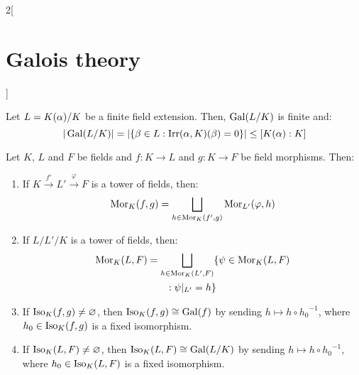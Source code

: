 \documentclass[../../../main.tex]{subfiles}
\begin{document}
\begin{multicols}{2}[\section{Galois theory}]
\begin{corollary}
    Let $L=\quot{K(\alpha)}{K}$ be a finite field extension. Then, $\Gal(\quot{L}{K})$ is finite and: $$\textstyle|\Gal(\quot{L}{K})|=|\{\beta\in L:\irr(\alpha,K)(\beta)=0\}|\leq[K(\alpha):K]$$
  \end{corollary}
  \begin{prop}
    Let $K$, $L$ and $F$ be fields and $f:K\rightarrow L$ and $g:K\rightarrow F$ be field morphisms. Then:
    \begin{enumerate}
      \item If $K\overset{f'}{\rightarrow} L'\overset{\varphi}{\rightarrow} F$ is a tower of fields, then: $$\operatorname{Mor}_K(f,g)=\bigsqcup_{h\in\operatorname{Mor}_K(f',g)}\operatorname{Mor}_{L'}(\varphi,h)$$
      \item If $L/L'/K$ is a tower of fields, then:
            \begin{multline*}
              \operatorname{Mor}_K(L,F)=\bigsqcup_{h\in\operatorname{Mor}_K(L',F)}\{\psi\in\operatorname{Mor}_K(L,F)\\
              :\psi|_{L'}=h\}
            \end{multline*}
      \item If $\operatorname{Iso}_K(f,g)\ne\varnothing$, then $\operatorname{Iso}_K(f,g)\cong\operatorname{Gal}(f)$ by sending $h\mapsto h\circ {h_0}^{-1}$, where $h_0\in\operatorname{Iso}_K(f,g)$ is a fixed isomorphism.
      \item If $\operatorname{Iso}_K(L,F)\ne\varnothing$, then $\Iso_K(L,F)\cong\Gal(\quot{L}{K})$ by sending $h\mapsto h\circ {h_0}^{-1}$, where $h_0\in\operatorname{Iso}_K(L,F)$ is a fixed isomorphism.
    \end{enumerate}
  \end{prop}

\end{multicols}
\end{document}
